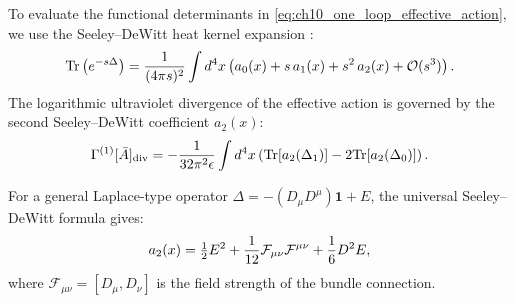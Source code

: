 To evaluate the functional determinants in \eqref{eq:ch10_one_loop_effective_action}, we use the Seeley--DeWitt heat kernel expansion \cite{deRham1984}:
\begin{equation}
\label{eq:ch10_heat_kernel_expansion}
\mathrm{Tr}\left( e^{-s \Delta} \right) = \frac{1}{(4\pi s)^2} \int d^4x \left( a_0(x) + s \, a_1(x) + s^2 \, a_2(x) + \mathcal{O}(s^3) \right).
\end{equation}
The logarithmic ultraviolet divergence of the effective action is governed by the second Seeley--DeWitt coefficient $a_2(x)$:
\begin{equation}
\label{eq:ch10_gamma_div}
\Gamma^{(1)}[\bar{A}]_{\mathrm{div}} = -\frac{1}{32\pi^2 \epsilon} \int d^4x \left( \mathrm{Tr}[a_2(\Delta_1)] - 2 \mathrm{Tr}[a_2(\Delta_0)] \right).
\end{equation}

For a general Laplace-type operator $\Delta = -(D_\mu D^\mu) \mathbf{1} + E$, the universal Seeley--DeWitt formula gives:
\begin{equation}
\label{eq:ch10_seeley_dewitt_formula}
a_2(x) = \tfrac{1}{2} E^2 + \frac{1}{12} \mathcal{F}_{\mu\nu} \mathcal{F}^{\mu\nu} + \frac{1}{6} D^2 E,
\end{equation}
where $\mathcal{F}_{\mu\nu} = [D_\mu, D_\nu]$ is the field strength of the bundle connection.

